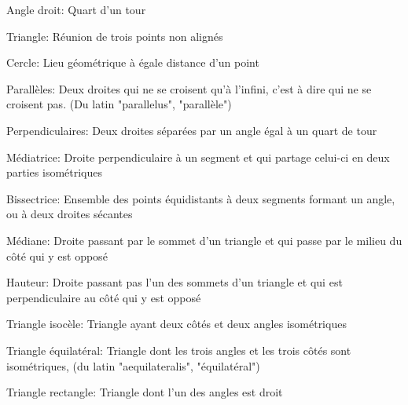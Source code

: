 \begin{definition}{Angle droit:}
Quart d'un tour
\end{definition}
\begin{definition}{Triangle:}
Réunion de trois points non alignés
\end{definition}
\begin{definition}{Cercle: }
Lieu géométrique à égale distance d'un point
\end{definition}
\begin{definition}{Parallèles:}
Deux droites qui ne se croisent qu'à l'infini, c'est à dire qui ne se croisent pas. (Du latin "parallelus", "parallèle")
\end{definition}
\begin{definition}{Perpendiculaires:}
Deux droites séparées par un angle égal à un quart de tour
\end{definition}
\begin{definition}{Médiatrice:}\label{def:mediatrice}
Droite perpendiculaire à un segment et qui partage celui-ci en deux parties isométriques
\end{definition}
\begin{definition}{Bissectrice:}
Ensemble des points équidistants à deux segments formant un angle, ou à deux droites sécantes
\end{definition}
\begin{definition}{Médiane:}
Droite passant par le sommet d'un triangle et qui passe par le milieu du côté qui y est opposé
\end{definition}
\begin{definition}{Hauteur:}
Droite passant pas l'un des sommets d'un triangle et qui est perpendiculaire au côté qui y est opposé
\end{definition}
\begin{definition}{Triangle isocèle:}
Triangle ayant deux côtés et deux angles isométriques
\end{definition}
\begin{definition}{Triangle équilatéral:}
Triangle dont les trois angles et les trois côtés sont isométriques, (du latin "aequilateralis", "équilatéral")
\end{definition}
\begin{definition}{Triangle rectangle:}
Triangle dont l'un des angles est droit
\end{definition}

%